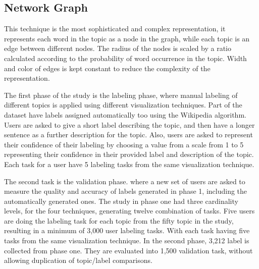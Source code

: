 \subsection{Network Graph}
This technique is the most sophisticated and complex representation, it represents each word in the topic as a node in the graph, while each topic is an
edge between different nodes. The radius of the nodes is scaled by a ratio calculated according to the probability of word occurrence in the topic. Width and
color of edges is kept constant to reduce the complexity of the representation.


\newParagraph
The first phase of the study is the labeling phase, where manual labeling of different topics is applied using different visualization techniques. Part of the
dataset have labels assigned automatically too using the Wikipedia algorithm. Users are asked to give a short label describing the topic, and then have a longer
sentence as a further description for the topic. Also, users are asked to represent their confidence of their labeling by choosing a value from a scale from 1 to 5
representing their confidence in their provided label and description of the topic. Each task for a user have 5 labeling tasks from the same visualization technique.

\newParagraph
The second task is the validation phase. where a new set of users are asked to measure the quality and accuracy of labels generated in phase 1, including the
automatically generated ones. The study in phase one had three cardinality levels, for the four techniques, generating twelve combination of tasks. Five users
are doing the labeling task for each topic from the fifty topic in the study, resulting in a minimum of 3,000 user labeling tasks. With each task having five
tasks from the same visualization technique. In the second phase, 3,212 label is collected from phase one. They are evaluated into 1,500 validation task, without
allowing duplication of topic/label comparisons. 
